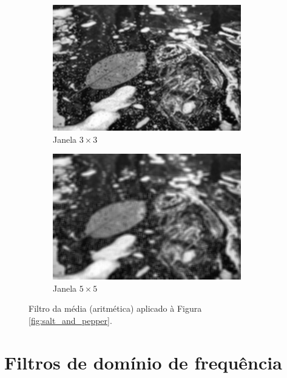 \documentclass[10pt,a4paper]{article}
\begin{document}
\begin{figure}[!ht]
    \centering
    \begin{subfigure}[ht]{0.45\textwidth}
        \includegraphics[width=\textwidth]{dst_sp_avg3.jpg}
        \caption{Janela $3 \times 3$}
        \label{fig:avg_filter3}
    \end{subfigure}
    \qquad
    \begin{subfigure}[ht]{0.45\textwidth}
        \includegraphics[width=\textwidth]{dst_sp_avg5.jpg}
        \caption{Janela $5 \times 5$}
        \label{fig:avg_filter5}
    \end{subfigure}
    \caption{Filtro da média (aritmética) aplicado à Figura \ref{fig:salt_and_pepper}.}
\end{figure}

\section{Filtros de domínio de frequência}
\end{document}
